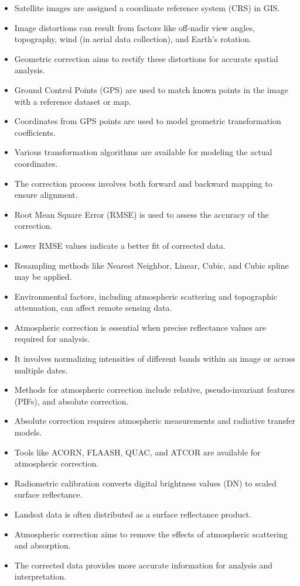 \documentclass[
  letterpaper,
  DIV=11,
  numbers=noendperiod]{scrreprt}
\begin{document}
\begin{itemize}
\item
  Satellite images are assigned a coordinate reference system (CRS) in
  GIS.
\item
  Image distortions can result from factors like off-nadir view angles,
  topography, wind (in aerial data collection), and Earth's rotation.
\item
  Geometric correction aims to rectify these distortions for accurate
  spatial analysis.
\item
  Ground Control Points (GPS) are used to match known points in the
  image with a reference dataset or map.
\item
  Coordinates from GPS points are used to model geometric transformation
  coefficients.
\item
  Various transformation algorithms are available for modeling the
  actual coordinates.
\item
  The correction process involves both forward and backward mapping to
  ensure alignment.
\item
  Root Mean Square Error (RMSE) is used to assess the accuracy of the
  correction.
\item
  Lower RMSE values indicate a better fit of corrected data.
\item
  Resampling methods like Nearest Neighbor, Linear, Cubic, and Cubic
  spline may be applied.
\item
  Environmental factors, including atmospheric scattering and
  topographic attenuation, can affect remote sensing data.
\item
  Atmospheric correction is essential when precise reflectance values
  are required for analysis.
\item
  It involves normalizing intensities of different bands within an image
  or across multiple dates.
\item
  Methods for atmospheric correction include relative, pseudo-invariant
  features (PIFs), and absolute correction.
\item
  Absolute correction requires atmospheric measurements and radiative
  transfer models.
\item
  Tools like ACORN, FLAASH, QUAC, and ATCOR are available for
  atmospheric correction.
\item
  Radiometric calibration converts digital brightness values (DN) to
  scaled surface reflectance.
\item
  Landsat data is often distributed as a surface reflectance product.
\item
  Atmospheric correction aims to remove the effects of atmospheric
  scattering and absorption.
\item
  The corrected data provides more accurate information for analysis and
  interpretation.
\end{itemize}
\end{document}
